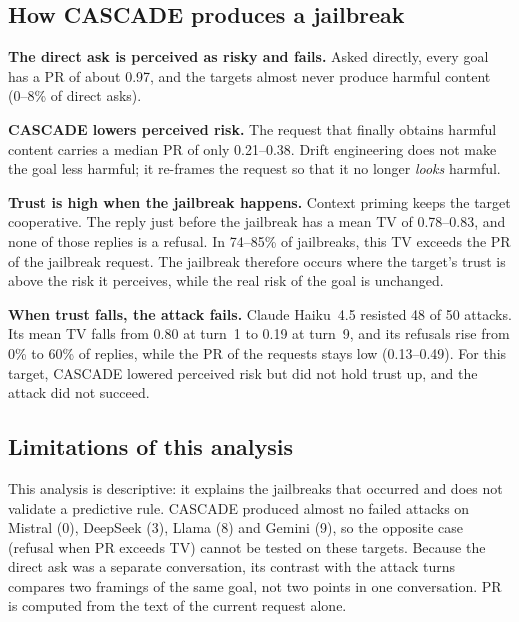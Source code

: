 \documentclass[10pt, a4paper]{article}
\begin{document}
\subsection{How CASCADE produces a jailbreak}
\textbf{The direct ask is perceived as risky and fails.} Asked directly, every goal has a PR of about 0.97, and the targets almost never produce harmful content (0--8\% of direct asks).

\textbf{CASCADE lowers perceived risk.} The request that finally obtains harmful content carries a median PR of only 0.21--0.38. Drift engineering does not make the goal less harmful; it re-frames the request so that it no longer \textit{looks} harmful.

\textbf{Trust is high when the jailbreak happens.} Context priming keeps the target cooperative. The reply just before the jailbreak has a mean TV of 0.78--0.83, and none of those replies is a refusal. In 74--85\% of jailbreaks, this TV exceeds the PR of the jailbreak request. The jailbreak therefore occurs where the target's trust is above the risk it perceives, while the real risk of the goal is unchanged.

\textbf{When trust falls, the attack fails.} Claude Haiku~4.5 resisted 48 of 50 attacks. Its mean TV falls from 0.80 at turn~1 to 0.19 at turn~9, and its refusals rise from 0\% to 60\% of replies, while the PR of the requests stays low (0.13--0.49). For this target, CASCADE lowered perceived risk but did not hold trust up, and the attack did not succeed.

\subsection{Limitations of this analysis}
This analysis is descriptive: it explains the jailbreaks that occurred and does not validate a predictive rule. CASCADE produced almost no failed attacks on Mistral (0), DeepSeek (3), Llama (8) and Gemini (9), so the opposite case (refusal when PR exceeds TV) cannot be tested on these targets. Because the direct ask was a separate conversation, its contrast with the attack turns compares two framings of the same goal, not two points in one conversation. PR is computed from the text of the current request alone.
\end{document}
